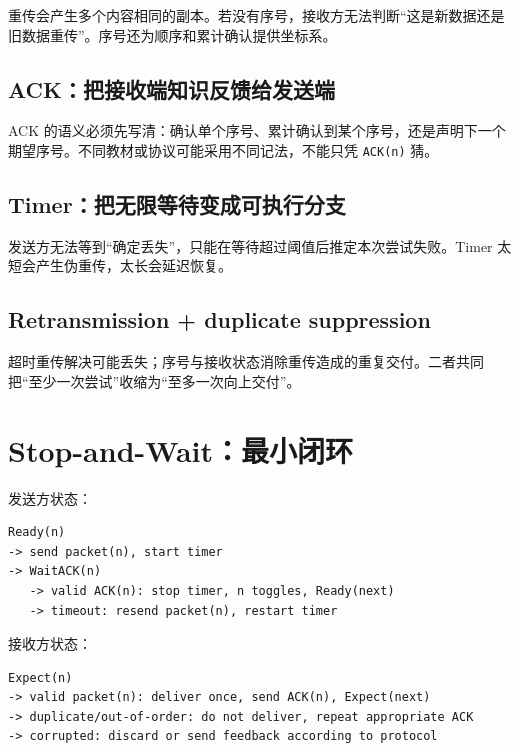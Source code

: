 \documentclass[UTF8,fontset=none,11pt,a4paper]{ctexart}
\providecommand{\passthrough}[1]{#1}
\begin{document}
重传会产生多个内容相同的副本。若没有序号，接收方无法判断``这是新数据还是旧数据重传''。序号还为顺序和累计确认提供坐标系。

\subsection{ACK：把接收端知识反馈给发送端}\label{23-ackux628aux63a5ux6536ux7aefux77e5ux8bc6ux53cdux9988ux7ed9ux53d1ux9001ux7aef}

ACK
的语义必须先写清：确认单个序号、累计确认到某个序号，还是声明下一个期望序号。不同教材或协议可能采用不同记法，不能只凭
\passthrough{\lstinline!ACK(n)!} 猜。

\subsection{Timer：把无限等待变成可执行分支}\label{24-timerux628aux65e0ux9650ux7b49ux5f85ux53d8ux6210ux53efux6267ux884cux5206ux652f}

发送方无法等到``确定丢失''，只能在等待超过阈值后推定本次尝试失败。Timer
太短会产生伪重传，太长会延迟恢复。

\subsection{Retransmission + duplicate
suppression}\label{25-retransmission--duplicate-suppression}

超时重传解决可能丢失；序号与接收状态消除重传造成的重复交付。二者共同把``至少一次尝试''收缩为``至多一次向上交付''。

\section{Stop-and-Wait：最小闭环}\label{3-stop-and-waitux6700ux5c0fux95edux73af}

发送方状态：

\begin{lstlisting}
Ready(n)
-> send packet(n), start timer
-> WaitACK(n)
   -> valid ACK(n): stop timer, n toggles, Ready(next)
   -> timeout: resend packet(n), restart timer
\end{lstlisting}

接收方状态：

\begin{lstlisting}
Expect(n)
-> valid packet(n): deliver once, send ACK(n), Expect(next)
-> duplicate/out-of-order: do not deliver, repeat appropriate ACK
-> corrupted: discard or send feedback according to protocol
\end{lstlisting}
\end{document}
